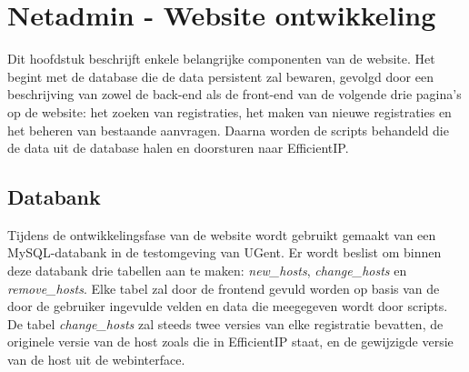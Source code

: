 
\chapter{Netadmin - Website ontwikkeling}%
\label{ch:netadmin-website-ontwikkeling}
Dit hoofdstuk beschrijft enkele belangrijke componenten van de website. Het begint met de database die de data persistent zal bewaren, gevolgd door een beschrijving van zowel de back-end als de front-end van de volgende drie pagina's op de website: het zoeken van registraties, het maken van nieuwe registraties en het beheren van bestaande aanvragen. Daarna worden de scripts behandeld die de data uit de database halen en doorsturen naar EfficientIP.

\section{Databank}
\label{databank}
Tijdens de ontwikkelingsfase van de website wordt gebruikt gemaakt van een MySQL-databank in de testomgeving van UGent. Er wordt beslist om binnen deze databank drie tabellen aan te maken: \textit{new\_hosts}, \textit{change\_hosts} en \textit{remove\_hosts}. Elke tabel zal door de frontend gevuld worden op basis van de door de gebruiker ingevulde velden en data die meegegeven wordt door scripts.
De tabel \textit{change\_hosts} zal steeds twee versies van elke registratie bevatten, de originele versie van de host zoals die in EfficientIP staat, en de gewijzigde versie van de host uit de webinterface.

